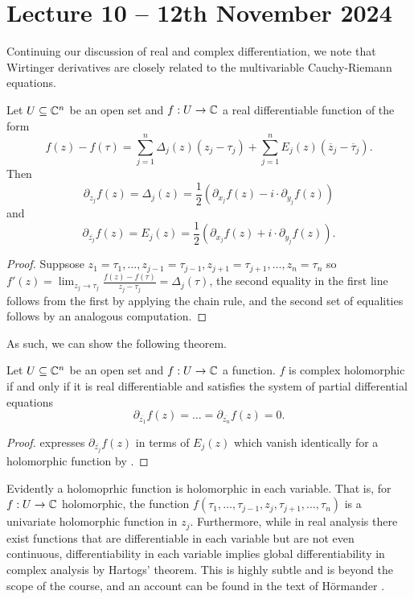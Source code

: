 \section{Lecture 10 -- 12th November 2024}\label{sec: lecture 10}
Continuing our discussion of real and complex differentiation, we note that Wirtinger derivatives are closely related to the multivariable Cauchy-Riemann equations. 
\begin{proposition}\label{prop: Wirtinger are partials}
    Let $U\subseteq\mathbb{C}^{n}$ be an open set and $f:U\to\mathbb{C}$ a real differentiable function of the form 
    $$f(z)-f(\tau)=\sum_{j=1}^{n}\Delta_{j}(z)(z_{j}-\tau_{j})+\sum_{j=1}^{n}E_{j}(z)(\overline{z}_{j}-\overline{\tau}_{j}).$$
    Then $$\partial_{z_{j}}f(z)=\Delta_{j}(z)=\frac{1}{2}\left(\partial_{x_{j}}f(z)-i\cdot\partial_{y_{j}}f(z)\right)$$
    and 
    $$\partial_{\overline{z_{j}}}f(z)=E_{j}(z)=\frac{1}{2}\left(\partial_{x_{j}}f(z)+i\cdot\partial_{y_{j}}f(z)\right).$$
\end{proposition}
\begin{proof}
    Suppsose $z_{1}=\tau_{1},\dots,z_{j-1}=\tau_{j-1},z_{j+1}=\tau_{j+1},\dots,z_{n}=\tau_{n}$ so $f'(z)=\lim_{z_{j}\to\tau_{j}}\frac{f(z)-f(\tau)}{z_{j}-\tau_{j}}=\Delta_{j}(\tau)$, the second equality in the first line follows from the first by applying the chain rule, and the second set of equalities follows by an analogous computation. 
\end{proof}
As such, we can show the following theorem. 
\begin{theorem}\label{thm: holomorphic iff differential equations}
    Let $U\subseteq\mathbb{C}^{n}$ be an open set and $f:U\to\mathbb{C}$ a function. $f$ is complex holomorphic if and only if it is real differentiable and satisfies the system of partial differential equations 
    $$\partial_{\overline{z_{1}}}f(z)=\dots=\partial_{\overline{z_{n}}}f(z)=0.$$
\end{theorem}
\begin{proof}
     expresses $\partial_{\overline{z_{j}}}f(z)$ in terms of $E_{j}(z)$ which vanish identically for a holomorphic function by . 
\end{proof}
\begin{remark}
    Evidently a holomoprhic function is holomorphic in each variable. That is, for $f:U\to\mathbb{C}$ holomorphic, the function $f(\tau_{1},\dots,\tau_{j-1},z_{j},\tau_{j+1},\dots,\tau_{n})$ is a univariate holomorphic function in $z_{j}$. Furthermore, while in real analysis there exist functions that are differentiable in each variable but are not even continuous, differentiability in each variable implies global differentiability in complex analysis by Hartogs' theorem. This is highly subtle and is beyond the scope of the course, and an account can be found in the text of H\"{o}rmander \cite{Hormander}. 
\end{remark}
